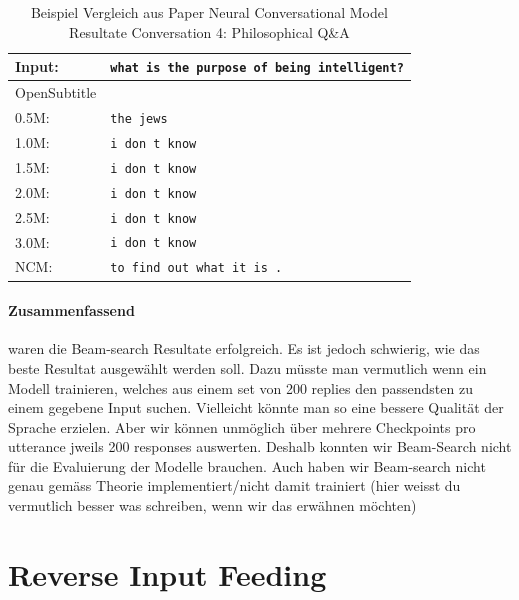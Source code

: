 \begin{table}[H]
	\centering
	\begin{adjustbox}{max width=\textwidth}
		\begin{tabular}{ll}
			\toprule
			Input: 	& \texttt{what is the purpose of being intelligent?}\\
			\midrule
			OpenSubtitle\\
			0.5M: 	& \texttt{the jews}\\
			1.0M: 	& \texttt{i don t know}\\
			1.5M:	& \texttt{i don t know}\\
			2.0M:	& \texttt{i don t know}\\
			2.5M:	& \texttt{i don t know}\\
			3.0M:	& \texttt{i don t know}\\
			\midrule
			NCM:	& \texttt{to find out what it is .}\\
			\bottomrule
		\end{tabular}
	\end{adjustbox}
	\caption{Beispiel Vergleich aus Paper Neural Conversational Model Resultate Conversation 4: Philosophical Q\&A}
	\label{results:example20_output:OpenSubtitle}
\end{table}

\paragraph{Zusammenfassend} waren die Beam-search Resultate erfolgreich. Es ist jedoch schwierig, wie das beste Resultat ausgewählt werden soll. Dazu müsste man vermutlich wenn ein Modell trainieren, welches aus einem set von 200 replies den passendsten zu einem gegebene Input suchen. Vielleicht könnte man so eine bessere Qualität der Sprache erzielen. Aber wir können unmöglich über mehrere Checkpoints pro utterance jweils 200 responses auswerten. Deshalb konnten wir Beam-Search nicht für die Evaluierung der Modelle brauchen. Auch haben wir Beam-search nicht genau gemäss Theorie implementiert/nicht damit trainiert (hier weisst du vermutlich besser was schreiben, wenn wir das erwähnen möchten)
\section{Reverse Input Feeding}
\blindtext